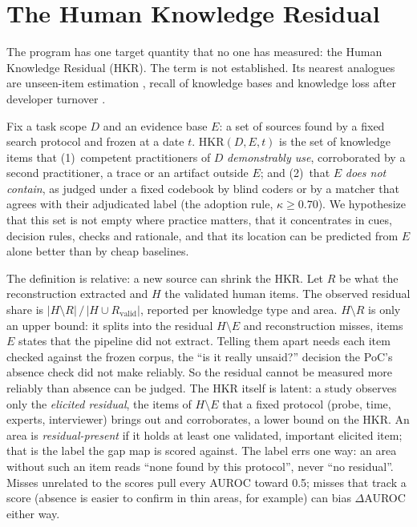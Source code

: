 \section{The Human Knowledge Residual}\label{sec:residual}

The program has one target quantity that no one has measured: the Human Knowledge Residual (HKR).
\evint{} The term is not established. Its nearest analogues are unseen-item estimation
\parencite{chao1987estimating}, recall of knowledge bases \parencite{razniewski2024completeness} and
knowledge loss after developer turnover \parencite{rigby2016quantifying}.

\begin{evhypbox}
  Fix a task scope $D$ and an evidence base $E$: a set of sources found by a fixed search protocol and
  frozen at a date $t$. $\mathrm{HKR}(D, E, t)$ is the set of knowledge items that (1)~competent
  practitioners of $D$ \emph{demonstrably use}, corroborated by a second practitioner, a trace or an
  artifact outside $E$; and (2)~that $E$ \emph{does not contain}, as judged under a fixed codebook by
  blind coders or by a matcher that agrees with their adjudicated label (the adoption rule,
  $\kappa \geq 0.70$). We hypothesize that
  this set is not empty where practice matters, that it concentrates in cues, decision rules, checks and
  rationale, and that its location can be predicted from $E$ alone better than by cheap baselines.
\end{evhypbox}

The definition is relative: a new source can shrink the HKR. Let $R$ be what the reconstruction extracted and $H$ the validated human items. The observed residual share is
$|H \setminus R| \,/\, |H \cup R_{\mathrm{valid}}|$, reported per knowledge type and area. \evint{}
$H \setminus R$ is only an upper bound: it splits into the residual $H \setminus E$ and reconstruction
misses, items $E$ states that the pipeline did not extract. Telling them apart needs each item checked
against the frozen corpus, the \enquote{is it really unsaid?} decision the PoC's absence check did not
make reliably. So the residual cannot be measured more reliably than absence can be judged. The HKR
itself is latent: a study observes only the \emph{elicited residual}, the items of $H \setminus E$ that a
fixed protocol (probe, time, experts, interviewer) brings out and corroborates, a lower bound on the HKR.
An area is \emph{residual-present} if it holds at least one validated, important elicited item; that is
the label the gap map is scored against. The label errs one way: an area without such an item reads
\enquote{none found by this protocol}, never \enquote{no residual}. Misses unrelated to the scores pull
every AUROC toward 0.5; misses that track a score (absence is easier to confirm in thin areas, for
example) can bias $\Delta$AUROC either way.

